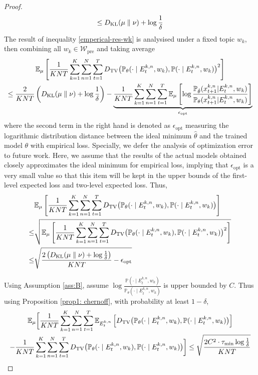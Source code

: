 \begin{proof}
\begin{multline}
		\leq D_{\mathrm{KL}}(\mu\parallel \nu) +\operatorname{log}\frac{1}{\delta}
	\end{multline}
	The result of inequality \ref{emperical-res-wk} is analysised under a fixed topic $w_k$, then combining all $w_k \in \mathcal{W}_{\text{pre}}$ and taking average 
	\begin{multline}
		\mathbb{E}_{\mu}\left[\frac{1}{KNT}\sum_{k=1}^K\sum_{n=1}^{N}\sum_{t=1}^TD_{\mathrm{TV}}\big(\mathbb{P}_{\theta}(\cdot\mid E^{k,n}_t,w_k),\mathbb{P}(\cdot\mid E^{k,n}_t,w_k)\big)^2\right] \\
		\leq \frac{2}{KNT}\left(D_{\mathrm{KL}}(\mu\parallel \nu)+\log\frac{1}{\delta}\right)-\underbrace{\frac{1}{KNT}\sum_{k=1}^K\sum_{n=1}^{N}\sum_{t=1}^T \mathbb{E}_{\mu}\left[\operatorname{log}\frac{\mathbb{P}_{\hat{\theta}}(x^{k,n}_{t+1}|E^{k,n}_t,w_k)}{\mathbb{P}_{\theta}(x^{k,n}_{t+1}|E^{k,n}_t,w_k)}\right]}_{\epsilon_{\text{opt}}}
	\end{multline}
	where the second term in the right hand is denoted as $\epsilon_{\text{opt}}$ measuring the logarithmic distribution distance between the ideal minimum $\hat{\theta}$ and the trained model $\theta$ with empirical loss. Specially, we defer the analysis of optimization error to future work. Here, we assume that the results of the actual models obtained closely approximates the ideal minimum for empirical loss, implying that \(\epsilon_{\text{opt}}\) is a very small value so that this item will be kept in the upper bounds of the first-level expected loss and two-level expected loss. Thus,
	\begin{align}
		&\mathbb{E}_{\mu}\left[\frac{1}{KNT}\sum_{k=1}^K\sum_{n=1}^{N}\sum_{t=1}^TD_{\mathrm{TV}}\big(\mathbb{P}_{\theta}(\cdot\mid E^{k,n}_t,w_k),\mathbb{P}(\cdot\mid E^{k,n}_t,w_k)\big)\right]\nonumber\\
		\leq&\sqrt{ \mathbb{E}_{\mu}\left[\frac{1}{KNT}\sum_{k=1}^K\sum_{n=1}^{N}\sum_{t=1}^TD_{\mathrm{TV}}\big(\mathbb{P}_{\theta}(\cdot\mid E^{k,n}_t,w_k),\mathbb{P}(\cdot\mid E^{k,n}_t,w_k)\big)^2\right]} \nonumber\\
		\leq& \sqrt{\frac{2\left(D_{\mathrm{KL}}(\mu\parallel \nu)+\operatorname{log}\frac{1}{\delta}\right)}{KNT}-\epsilon_{\text{opt}}}  \label{emperical-res-wpre}
	\end{align}
	
	Using Assumption \ref{ass:B}, assume $\log\frac{\mathbb{P}(\cdot\mid E^{k,n}_t,w_k)}{\mathbb{P}_{\theta}(\cdot\mid E^{k,n}_t,w_k)}$ is upper bounded by $C$. Thus using Proposition \ref{prop1: chernoff}, with probability at least $1-\delta$,
	\begin{multline}\label{first-exp-minus}
		\mathbb{E}_{\mu}\biggl[\frac{1}{KNT}\sum_{k=1}^K\sum_{n=1}^N\sum_{t=1}^T\mathbb{E}_{E^{k,n}_t}\left[D_{\mathrm{TV}}\big(\mathbb{P}_{\theta}(\cdot\mid E^{k,n}_t,w_k),\mathbb{P}(\cdot\mid E^{k,n}_t,w_k)\big)\right] \\
		-\frac{1}{KNT}\sum_{k=1}^K\sum_{n=1}^{N}\sum_{t=1}^TD_{\mathrm{TV}}\big(\mathbb{P}_{\theta}(\cdot\mid E^{k,n}_t,w_k),\mathbb{P}(\cdot\mid E^{k,n}_t,w_k)\big)\biggr]
		\leq \sqrt{\frac{2C^2\cdot \tau_{\min}\log \frac{1}{\delta}}{KNT}}
	\end{multline}
	

\end{proof}
